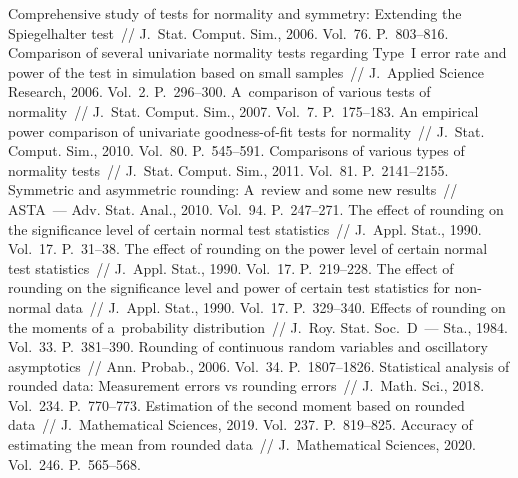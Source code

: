 \begin{multicols}{2}
{\small\frenchspacing
 {%
 \begin{thebibliography}{99}
Comprehensive study of tests for normality and symmetry: Extending the Spiegelhalter test~// 
J.~Stat. Comput. Sim., 2006. Vol.~76. P.~803--816.
Comparison of several univariate normality tests regarding Type~I error rate and power of the test in
simulation based on small samples~// J.~Applied Science Research, 2006. Vol.~2. P.~296--300.
A~comparison of various tests of normality~// J.~Stat. Comput. Sim., 2007. Vol.~7. P.~175--183.
An empirical power comparison of univariate goodness-of-fit
tests for normality~// J.~Stat. Comput. Sim., 2010. Vol.~80. P.~545--591.
Comparisons of various types of normality tests~// J.~Stat. Comput. Sim., 2011. Vol.~81. P.~2141--2155.
Symmetric and asymmetric rounding: A~review and some new results~// ASTA~--- Adv. Stat. Anal., 2010. Vol.~94. P.~247--271.
The effect of rounding on the significance level of certain normal test statistics~// J.~Appl. Stat., 1990. Vol.~17. P.~31--38.
The effect of rounding on the power level of certain normal test statistics~// J.~Appl. Stat., 1990. Vol.~17. P.~219--228.
The effect of rounding on the significance level and power of certain test statistics for non-normal data~// J.~Appl. Stat., 1990. Vol.~17. P.~329--340.
Effects of rounding on the moments of a~probability distribution~// J.~Roy. Stat. Soc.~D~---
Sta., 1984. Vol.~33. P.~381--390.
Rounding of continuous random variables and oscillatory asymptotics~// Ann. Probab., 2006. Vol.~34. P.~1807--1826.
Statistical analysis of rounded data: Measurement errors vs rounding errors~// J.~Math. Sci., 2018. Vol.~234. P.~770--773.
Estimation of the second moment based on rounded data~// J.~Mathematical Sciences, 2019. Vol.~237. P.~819--825.
Accuracy of estimating the mean from rounded data~// J.~Mathematical Sciences, 2020. Vol.~246. P.~565--568.
\end{thebibliography}

 }
 }

\end{multicols}

